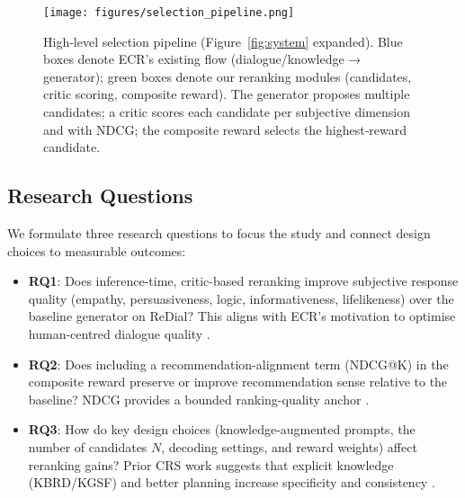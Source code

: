 \documentclass[12pt]{article}
\begin{document}
  \begin{figure}[h]
  \centering
  \texttt{[image: figures/selection\_pipeline.png]}
  \caption{High‑level selection pipeline (Figure~\ref{fig:system} expanded). Blue boxes denote ECR's existing flow (dialogue/knowledge → generator); green boxes denote our reranking modules (candidates, critic scoring, composite reward). The generator proposes multiple candidates; a critic scores each candidate per subjective dimension and with NDCG; the composite reward selects the highest‑reward candidate.}
  \label{fig:contrib_pipeline}
  \end{figure}
  
  \subsection{Research Questions}
  We formulate three research questions to focus the study and connect design choices to measurable outcomes:
  \begin{itemize}[leftmargin=*]
    \item \textbf{RQ1}: Does inference-time, critic-based reranking improve subjective response quality (empathy, persuasiveness, logic, informativeness, lifelikeness) over the baseline generator on ReDial? 
    \newline
    This aligns with ECR's motivation to optimise human-centred dialogue quality \citep{zhang2024ecr}.
    \item \textbf{RQ2}: Does including a recommendation-alignment term (NDCG@K) in the composite reward preserve or improve recommendation sense relative to the baseline? 
    \newline
    NDCG provides a bounded ranking-quality anchor \citep{evidently_ndcg}.
    \item \textbf{RQ3}: How do key design choices (knowledge-augmented prompts, the number of candidates $N$, decoding settings, and reward weights) affect reranking gains? 
    \newline
    Prior CRS work suggests that explicit knowledge (KBRD/KGSF) and better planning increase specificity and consistency \citep{chen2020kbrd,zhou2020kgsf,speer2017conceptnet,dbpedia_wikipedia,lewis2020rag}.
  \end{itemize}
\end{document}
